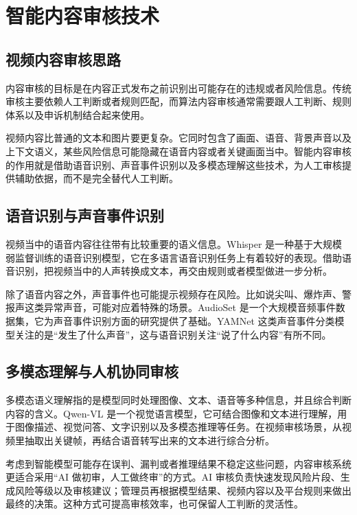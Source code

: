 \section{智能内容审核技术}
\label{sec:intelligent-content-audit-revised}

\subsection{视频内容审核思路}
\label{subsec:audit-basic-idea}

内容审核的目标是在内容正式发布之前识别出可能存在的违规或者风险信息。传统审核主要依赖人工判断或者规则匹配，而算法内容审核通常需要跟人工判断、规则体系以及申诉机制结合起来使用\cite{gorwa2020algorithmic}。

视频内容比普通的文本和图片要更复杂。它同时包含了画面、语音、背景声音以及上下文语义，某些风险信息可能隐藏在语音内容或者关键画面当中。智能内容审核的作用就是借助语音识别、声音事件识别以及多模态理解这些技术，为人工审核提供辅助依据，而不是完全替代人工判断。

\subsection{语音识别与声音事件识别}
\label{subsec:speech-audio-event}

视频当中的语音内容往往带有比较重要的语义信息。Whisper 是一种基于大规模弱监督训练的语音识别模型，它在多语言语音识别任务上有着较好的表现\cite{radford2023whisper}。借助语音识别，把视频当中的人声转换成文本，再交由规则或者模型做进一步分析。

除了语音内容之外，声音事件也可能提示视频存在风险。比如说尖叫、爆炸声、警报声这类异常声音，可能对应着特殊的场景。AudioSet 是一个大规模音频事件数据集，它为声音事件识别方面的研究提供了基础\cite{gemmeke2017audioset}。YAMNet 这类声音事件分类模型关注的是“发生了什么声音”，这与语音识别关注“说了什么内容”有所不同。

\subsection{多模态理解与人机协同审核}
\label{subsec:multimodal-human-machine}

多模态语义理解指的是模型同时处理图像、文本、语音等多种信息，并且综合判断内容的含义。Qwen-VL 是一个视觉语言模型，它可结合图像和文本进行理解，用于图像描述、视觉问答、文字识别以及多模态推理等任务\cite{bai2023qwen}。在视频审核场景，从视频里抽取出关键帧，再结合语音转写出来的文本进行综合分析。

考虑到智能模型可能存在误判、漏判或者推理结果不稳定这些问题，内容审核系统更适合采用“AI 做初审，人工做终审”的方式。AI 审核负责快速发现风险片段、生成风险等级以及审核建议；管理员再根据模型结果、视频内容以及平台规则来做出最终的决策。这种方式可提高审核效率，也可保留人工判断的灵活性。

